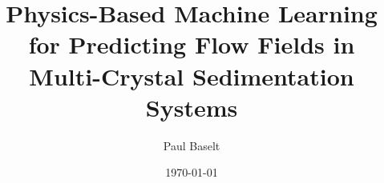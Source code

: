 \documentclass[12pt,twoside,openright]{scrreprt}
\title{Physics-Based Machine Learning for Predicting Flow Fields in Multi-Crystal Sedimentation Systems}
\author{Paul Baselt}
\date{\today}
\begin{document}





\tableofcontents
\listoffigures
\listoftables
\lstlistoflistings  %










\appendix



\printbibliography
\end{document}
